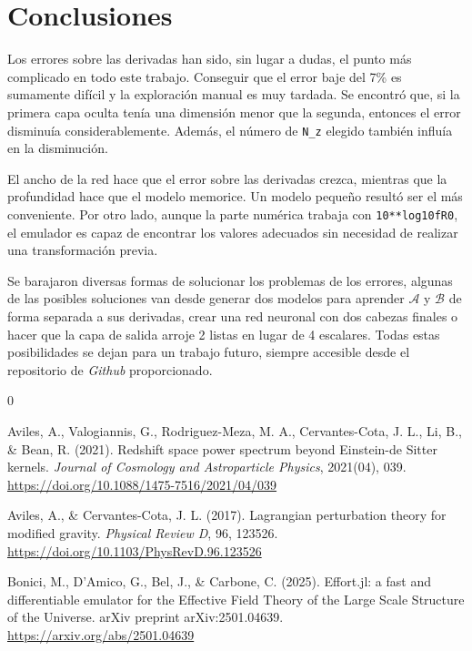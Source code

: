 \documentclass[letterpaper, 12pt]{article}
\begin{document}
    \section{Conclusiones}
        Los errores sobre las derivadas han sido, sin lugar a dudas, el punto más complicado en todo este trabajo. Conseguir que el error baje del 7\% es sumamente difícil y la exploración manual es muy tardada. Se encontró que, si la primera capa oculta tenía una dimensión menor que la segunda, entonces el error disminuía considerablemente. Además, el número de \texttt{N\_z} elegido también influía en la disminución.

        El ancho de la red hace que el error sobre las derivadas crezca, mientras que la profundidad hace que el modelo memorice. Un modelo pequeño resultó ser el más conveniente. Por otro lado, aunque la parte numérica trabaja con \texttt{10**log10fR0}, el emulador es capaz de encontrar los valores adecuados sin necesidad de realizar una transformación previa.

        Se barajaron diversas formas de solucionar los problemas de los errores, algunas de las posibles soluciones van desde generar dos modelos para aprender $\mathcal{A}$ y $\mathcal{B}$ de forma separada a sus derivadas, crear una red neuronal con dos cabezas finales o hacer que la capa de salida arroje 2 listas en lugar de 4 escalares. Todas estas posibilidades se dejan para un trabajo futuro, siempre accesible desde el repositorio de \emph{Github} proporcionado.

    \begin{thebibliography}{0}

         Aviles, A., Valogiannis, G., Rodriguez-Meza, M. A., Cervantes-Cota, J. L., Li, B., \& Bean, R. (2021). Redshift space power spectrum beyond Einstein-de Sitter kernels. \textit{Journal of Cosmology and Astroparticle Physics}, 2021(04), 039. \url{https://doi.org/10.1088/1475-7516/2021/04/039}
        
         Aviles, A., \& Cervantes-Cota, J. L. (2017). Lagrangian perturbation theory for modified gravity. \textit{Physical Review D}, 96, 123526. \url{https://doi.org/10.1103/PhysRevD.96.123526}
        
         Bonici, M., D'Amico, G., Bel, J., \& Carbone, C. (2025). Effort.jl: a fast and differentiable emulator for the Effective Field Theory of the Large Scale Structure of the Universe. arXiv preprint arXiv:2501.04639. \url{https://arxiv.org/abs/2501.04639}

\end{thebibliography}
\end{document}
